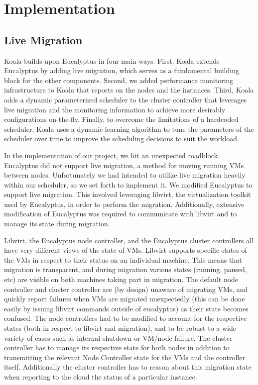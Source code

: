\section{Implementation}
\label{sec:impl}

\subsection{Live Migration}


Koala builds upon Eucalyptus in four main ways.  First, Koala extends
Eucalyptus by adding live migration, which serves as a fundamental building
block for the other components.  Second, we added performance monitoring
infrastructure to Koala that reports on the nodes and the instances. Third,
Koala adds a dynamic parameterized scheduler to the cluster controller that
leverages live migration and the monitoring information to achieve more
desirably configurations on-the-fly.  Finally, to overcome the limitations of a
hardcoded scheduler, Koala uses a dynamic learning algorithm to tune the
parameters of the scheduler over time to improve the scheduling decisions to
suit the workload.

In the implementation of our project, we hit an unexpected roadblock.  Eucalyptus did not support live migration, a method for moving running VMs between nodes.  Unfortunately we had intended to utilize live migration heavily within our scheduler, so we set forth to implement it.  We modified Eucalyptus to support live migration.  This involved leveraging libvirt, the virtualization toolkit used by Eucalyptus, in order to perform the migration.  Additionally, extensive modification of Eucalyptus was required to communicate with libvirt and to manage its state during migration.  

Libvirt, the Eucalyptus node controller, and the Eucalyptus cluster controllers all have very different views of the state of VMs.  Libvirt supports specific states of the VMs in respect to their status on an individual machine. This means that migration is transparent, and during migration various states (running, paused, etc) are visible on both machines taking part in migration.  The default node controller and cluster controller are (by design) unaware of migrating VMs, and quickly report failures when VMs are migrated unexpectedly (this can be done easily by issuing libvirt commands outside of eucalyptus) as their state becomes confused.  The node controllers had to be modified to account for the respective states (both in respect to libvirt and migration), and to be robust to a wide variety of cases such as internal shutdown or VM/node failure.  The cluster controller has to manage its respective state for both nodes in addition to transmitting the relevant Node Controller state for the VMs and the controller itself.  Additionally the cluster controller has to reason about this migration state when reporting to the cloud the status of a particular instance.

